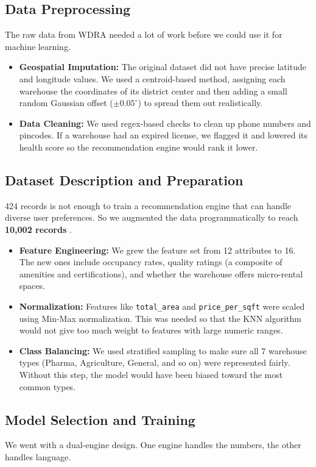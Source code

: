 \documentclass[conference]{IEEEtran}
\begin{document}
\subsection{Data Preprocessing}
The raw data from WDRA needed a lot of work before we could use it for machine learning.
\begin{itemize}
    \item \textbf{Geospatial Imputation:} The original dataset did not have precise latitude and longitude values. We used a centroid-based method, assigning each warehouse the coordinates of its district center and then adding a small random Gaussian offset ($\pm 0.05^\circ$) to spread them out realistically.
    \item \textbf{Data Cleaning:} We used regex-based checks to clean up phone numbers and pincodes. If a warehouse had an expired license, we flagged it and lowered its health score so the recommendation engine would rank it lower.
\end{itemize}

\subsection{Dataset Description and Preparation}
424 records is not enough to train a recommendation engine that can handle diverse user preferences. So we augmented the data programmatically to reach \textbf{10,002 records} \cite{b10}.
\begin{itemize}
    \item \textbf{Feature Engineering:} We grew the feature set from 12 attributes to 16. The new ones include occupancy rates, quality ratings (a composite of amenities and certifications), and whether the warehouse offers micro-rental spaces.
    \item \textbf{Normalization:} Features like \texttt{total\_area} and \texttt{price\_per\_sqft} were scaled using Min-Max normalization. This was needed so that the KNN algorithm would not give too much weight to features with large numeric ranges.
    \item \textbf{Class Balancing:} We used stratified sampling to make sure all 7 warehouse types (Pharma, Agriculture, General, and so on) were represented fairly. Without this step, the model would have been biased toward the most common types.
\end{itemize}

\subsection{Model Selection and Training}
We went with a dual-engine design. One engine handles the numbers, the other handles language.
\end{document}
